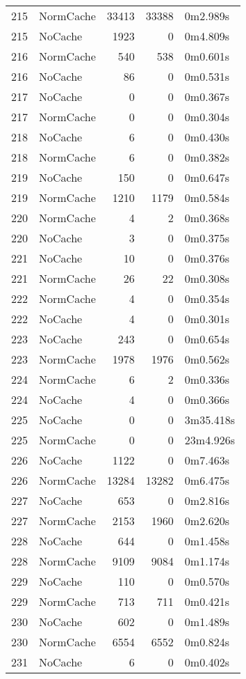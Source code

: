\begin{tabular}{llrrl}
215 & NormCache & 33413 & 33388 & 0m2.989s \\
215 & NoCache & 1923 & 0 & 0m4.809s \\
216 & NormCache & 540 & 538 & 0m0.601s \\
216 & NoCache & 86 & 0 & 0m0.531s \\
217 & NoCache & 0 & 0 & 0m0.367s \\
217 & NormCache & 0 & 0 & 0m0.304s \\
218 & NoCache & 6 & 0 & 0m0.430s \\
218 & NormCache & 6 & 0 & 0m0.382s \\
219 & NoCache & 150 & 0 & 0m0.647s \\
219 & NormCache & 1210 & 1179 & 0m0.584s \\
220 & NormCache & 4 & 2 & 0m0.368s \\
220 & NoCache & 3 & 0 & 0m0.375s \\
221 & NoCache & 10 & 0 & 0m0.376s \\
221 & NormCache & 26 & 22 & 0m0.308s \\
222 & NormCache & 4 & 0 & 0m0.354s \\
222 & NoCache & 4 & 0 & 0m0.301s \\
223 & NoCache & 243 & 0 & 0m0.654s \\
223 & NormCache & 1978 & 1976 & 0m0.562s \\
224 & NormCache & 6 & 2 & 0m0.336s \\
224 & NoCache & 4 & 0 & 0m0.366s \\
225 & NoCache & 0 & 0 & 3m35.418s \\
225 & NormCache & 0 & 0 & 23m4.926s \\
226 & NoCache & 1122 & 0 & 0m7.463s \\
226 & NormCache & 13284 & 13282 & 0m6.475s \\
227 & NoCache & 653 & 0 & 0m2.816s \\
227 & NormCache & 2153 & 1960 & 0m2.620s \\
228 & NoCache & 644 & 0 & 0m1.458s \\
228 & NormCache & 9109 & 9084 & 0m1.174s \\
229 & NoCache & 110 & 0 & 0m0.570s \\
229 & NormCache & 713 & 711 & 0m0.421s \\
230 & NoCache & 602 & 0 & 0m1.489s \\
230 & NormCache & 6554 & 6552 & 0m0.824s \\
231 & NoCache & 6 & 0 & 0m0.402s \\

\end{tabular}
